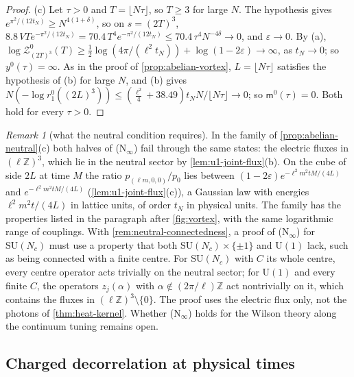 \documentclass[11pt,a4paper]{amsart}
\theoremstyle{definition}
\theoremstyle{remark}
\newtheorem{remark}[theorem]{Remark}
\numberwithin{equation}{section}
\newcommand{\Z}{\mathbb{Z}}          %
\newcommand{\SU}{\mathrm{SU}}              %
\newcommand{\U}{\mathrm{U}}                %
\newcommand{\TT}{\mathbb{T}}               %
\newcommand{\Zc}{\mathcal{Z}}              %
\newcommand{\cube}[1]{(2#1)^3}             %
\begin{document}
\begin{proof}
(c) Let $\tau>0$ and $T=\lfloor N\tau\rfloor$, so $T\ge3$ for large $N$. The hypothesis gives $e^{\pi^2/(12t_N)}\ge N^{4(1+\delta)}$, so on $s=\cube T$, $8.8\,VTe^{-\pi^2/(12t_N)}=70.4\,T^4e^{-\pi^2/(12t_N)}\le70.4\,\tau^4N^{-4\delta}\to0$, and $\varepsilon\to0$. By (a), $\log\Zc^0_{\cube T}(T)\ge\frac12\log(4\pi/(\ell^2t_N))+\log(1-2\varepsilon)\to\infty$, as $t_N\to0$; so $y^0(\tau)=\infty$. As in the proof of \cref{prop:abelian-vortex}, $L=\lfloor N\tau\rfloor$ satisfies the hypothesis of (b) for large $N$, and (b) gives $N(-\log r_1^0(\cube L))\le(\frac{\ell^2}4+38.49)t_NN/\lfloor N\tau\rfloor\to0$; so $\mathsf m^0(\tau)=0$. Both hold for every $\tau>0$.
\end{proof}

\begin{remark}[what the neutral condition requires]\label{rem:abelian-neutral}
In the family of \cref{prop:abelian-neutral}\textup{(c)} both halves of \textup{(N$_\infty$)} fail through the same states: the electric fluxes in $(\ell\Z)^3$, which lie in the neutral sector by \cref{lem:u1-joint-flux}\textup{(b)}. On the cube of side $2L$ at time $M$ the ratio $p_{(\ell m,0,0)}/p_0$ lies between $(1-2\varepsilon)e^{-\ell^2m^2tM/(4L)}$ and $e^{-\ell^2m^2tM/(4L)}$ (\cref{lem:u1-joint-flux}\textup{(c)}), a Gaussian law with energies $\ell^2m^2t/(4L)$ in lattice units, of order $t_N$ in physical units. The family has the properties listed in the paragraph after \cref{fig:vortex}, with the same logarithmic range of couplings. With \cref{rem:neutral-connectedness}, a proof of \textup{(N$_\infty$)} for $\SU(N_c)$ must use a property that both $\SU(N_c)\times\{\pm1\}$ and $\U(1)$ lack, such as being connected with a finite centre. For $\SU(N_c)$ with $C$ its whole centre, every centre operator acts trivially on the neutral sector; for $\U(1)$ and every finite $C$, the operators $z_j(\alpha)$ with $\alpha\notin(2\pi/\ell)\Z$ act nontrivially on it, which contains the fluxes in $(\ell\Z)^3\setminus\{0\}$. The proof uses the electric flux only, not the photons of \cref{thm:heat-kernel}. Whether \textup{(N$_\infty$)} holds for the Wilson theory along the continuum tuning remains open.
\end{remark}

\subsection{Charged decorrelation at physical times}\label{sec:timed-decorrelation}
\end{document}
